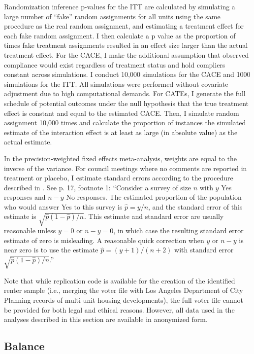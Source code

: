 \documentclass[12pt,final,fleqn]{article}
\theoremstyle{plain}
\begin{document}
Randomization inference p-values for the ITT are calculated by simulating a large number of ``fake'' random assignments for all units using the same procedure as the real random assignment, and estimating a treatment effect for each fake random assignment. I then calculate a p value as the proportion of times fake treatment assignments resulted in an effect size larger than the actual treatment effect. For the CACE, I make the additional assumption that observed compliance would exist regardless of treatment status and hold compliers constant across simulations. I conduct 10,000 simulations for the CACE and 1000 simulations for the ITT. All simulations were performed without covariate adjustment due to high computational demands. For CATEs, I generate the full schedule of potential outcomes under the null hypothesis that the true treatment effect is constant and equal to the estimated CACE. Then, I simulate random assignment 10,000 times and calculate the proportion of instances the simulated estimate of the interaction effect is at least as large (in absolute value) as the actual estimate.

In the precision-weighted fixed effects meta-analysis, weights are equal to the inverse of the variance. For council meetings where no comments are reported in treatment or placebo, I estimate standard errors according to the procedure described in \citet{gelman2006data}. See p. 17, footnote 1: ``Consider a survey of size $n$ with $y$ Yes responses and $n-y$ No responses. The estimated proportion of the population who woul­d answer Yes to this survey is $\hat{p} = y/n$, and the standard error of this estimate is $\sqrt{\hat{p}(1-\hat{p})/n}$. This estimate and standard error are usually reasonable unless $y=0$ or $n-y = 0$, in which case the resulting standard error estimate of zero is misleading. A reasonable quick correction when $y$ or $n-y$ is near zero is to use the estimate $\hat{p} =(y+1)/(n+2)$ with standard error $\sqrt{\hat{p}(1-\hat{p})/n}$.''

Note that while replication code is available for the creation of the identified renter sample (i.e., merging the voter file with Los Angeles Department of City Planning records of multi-unit housing developments), the full voter file cannot be provided for both legal and ethical reasons. However, all data used in the analyses described in this section  are available in anonymized form. 


\pagebreak
\subsection{Balance} \label{sec: balance}
\end{document}

